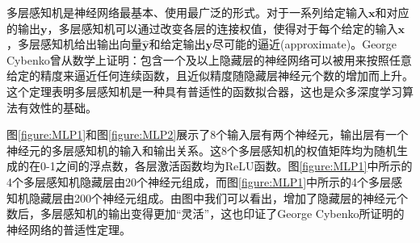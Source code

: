 \documentclass[a4paper]{ctexart}
\begin{document}
\begin{spacing}{1.3}
	多层感知机是神经网络最基本、使用最广泛的形式。对于一系列给定输入$\bm{x}$和对应的输出$\bm{y}$，多层感知机可以通过改变各层的连接权值，使得对于每个给定的输入$\bm{x}$，多层感知机给出输出向量$\hat{\bm{y}}$和给定输出$\bm{y}$尽可能的逼近(approximate)。George Cybenko曾从数学上证明：包含一个及以上隐藏层的神经网络可以被用来按照任意给定的精度来逼近任何连续函数，且近似精度随隐藏层神经元个数的增加而上升\cite{RN122}。这个定理表明多层感知机是一种具有普适性的函数拟合器，这也是众多深度学习算法有效性的基础。

	图\ref{figure:MLP1}和图\ref{figure:MLP2}展示了8个输入层有两个神经元，输出层有一个神经元的多层感知机的输入和输出关系。这8个多层感知机的权值矩阵均为随机生成的在0-1之间的浮点数，各层激活函数均为ReLU函数。图\ref{figure:MLP1}中所示的4个多层感知机隐藏层由20个神经元组成，而图\ref{figure:MLP1}中所示的4个多层感知机隐藏层由200个神经元组成。由图中我们可以看出，增加了隐藏层的神经元个数后，多层感知机的输出变得更加“灵活”，这也印证了George Cybenko所证明的神经网络的普适性定理。


\end{spacing}
\end{document}
